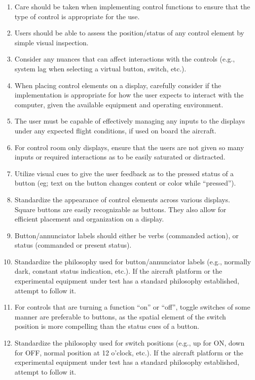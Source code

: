 \documentclass[
]{book}
\providecommand{\tightlist}{%
  \setlength{\itemsep}{0pt}\setlength{\parskip}{0pt}}
\begin{document}
\begin{enumerate}
\begin{enumerate}
    \begin{enumerate}
    \def\labelenumiii{\arabic{enumiii}.}
    \tightlist
    \item
      Care should be taken when implementing control functions to ensure that the type of control is appropriate for the use.
    \item
      Users should be able to assess the position/status of any control element by simple visual inspection.
    \item
      Consider any nuances that can affect interactions with the controls (e.g., system lag when selecting a virtual button, switch, etc.).
    \item
      When placing control elements on a display, carefully consider if the implementation is appropriate for how the user expects to interact with the computer, given the available equipment and operating environment.
    \item
      The user must be capable of effectively managing any inputs to the displays under any expected flight conditions, if used on board the aircraft.
    \item
      For control room only displays, ensure that the users are not given so many inputs or required interactions as to be easily saturated or distracted.
    \item
      Utilize visual cues to give the user feedback as to the pressed status of a button (eg; text on the button changes content or color while ``pressed'').
    \item
      Standardize the appearance of control elements across various displays. Square buttons are easily recognizable as buttons. They also allow for efficient placement and organization on a display.
    \item
      Button/annunciator labels should either be verbs (commanded action), or status (commanded or present status).
    \item
      Standardize the philosophy used for button/annunciator labels (e.g., normally dark, constant status indication, etc.). If the aircraft platform or the experimental equipment under test has a standard philosophy established, attempt to follow it.
    \item
      For controls that are turning a function ``on'' or ``off'', toggle switches of some manner are preferable to buttons, as the spatial element of the switch position is more compelling than the status cues of a button.
    \item
      Standardize the philosophy used for switch positions (e.g., up for ON, down for OFF, normal position at 12 o'clock, etc.). If the aircraft platform or the experimental equipment under test has a standard philosophy established, attempt to follow it.

\end{enumerate}
\end{enumerate}
\end{enumerate}
\end{document}
